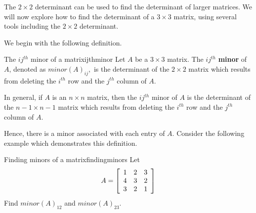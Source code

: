 The $2 \times 2$ determinant can be used to find the determinant of larger matrices.
We will now explore how to find the determinant of a $3 \times 3$ matrix, using several tools
including the $2 \times 2$ determinant.

We begin with the following definition. 

\begin{definition}{The $ij^{th}$ minor of a matrix}{ijthminor}
Let $A$ be a $3\times 3$ matrix. The $ij^{th}$ \textbf{minor} of $A$, denoted as $minor\left( A\right) _{ij},$ is the determinant
of the $2\times 2$ matrix which results from deleting the $i^{th}$ row and
the $j^{th}$ column of $A$.

In general, if $A$ is an $n\times n$ matrix, then the $ij^{th}$ minor of $A$ is the determinant of the $n-1 \times n-1$ matrix which results from deleting the $i^{th}$ row and the $j^{th}$ column of $A$. 
\end{definition}

Hence, there is a minor associated with each entry of $A$. Consider the following example which demonstrates this definition. 

\begin{example}{Finding minors of a matrix}{findingminors}
Let 
\begin{equation*}
A = \left[
\begin{array}{rrr}
1 & 2 & 3 \\
4 & 3 & 2 \\
3 & 2 & 1
\end{array}
\right] 
\end{equation*}
Find $minor\left( A\right) _{12}$ and $minor\left( A\right) _{23}$.
\end{example}

